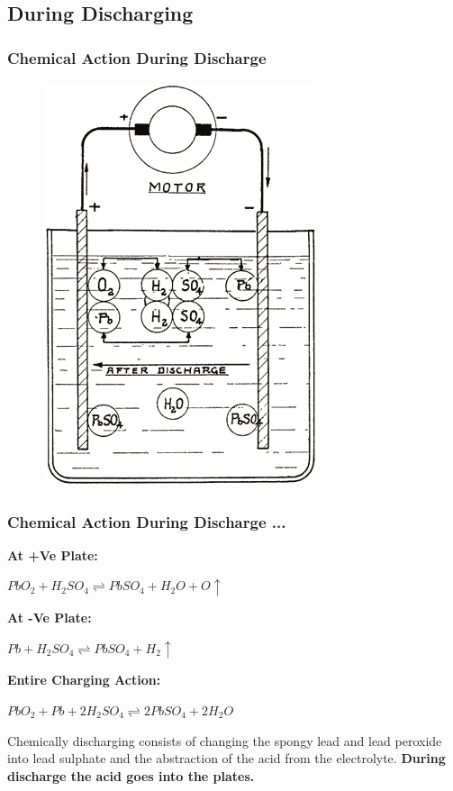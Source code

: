 \documentclass{beamer}
\begin{document}
\subsection{During Discharging}

\begin{frame}    %
  \frametitle{Chemical Action During Discharge}
  \begin{figure}
    \includegraphics[width=0.4\linewidth]{./Resources/Images/chemistry_during_discharge.jpg}
  \end{figure}
\end{frame}

\begin{frame}    %
  \frametitle{Chemical Action During Discharge ...}
  \fontsize{8pt}{12}\selectfont
    
  \textbf{At +Ve Plate:}
  \begin{center}
    $ PbO_{2} + H_{2}SO_{4} \rightleftharpoons PbSO_{4} + H_{2}O + O \uparrow$
  \end{center}
  \textbf{At -Ve Plate:}
  \begin{center}
    $ Pb + H_{2}SO_{4} \rightleftharpoons PbSO_{4} + H_{2} \uparrow$
  \end{center}  
  \textbf{Entire Charging Action:}
  \begin{center}
    $ PbO_{2} + Pb + 2H_{2}SO_{4} \rightleftharpoons 2PbSO_{4} + 2H_{2}O $
  \end{center}  


Chemically discharging consists of changing the spongy lead and lead peroxide into lead sulphate 
and the abstraction of the acid from the electrolyte. \textbf{During discharge the acid goes into the plates.}
\end{frame}
\end{document}
